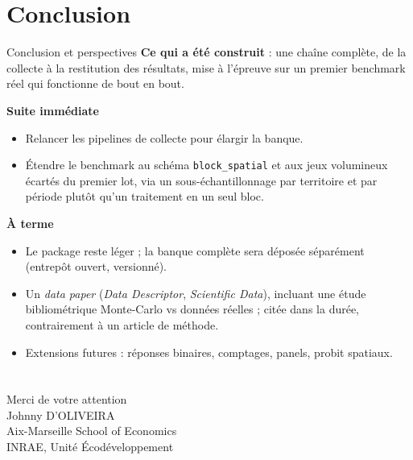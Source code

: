 \documentclass[aspectratio=169,11pt]{beamer}
\begin{document}
\section{Conclusion}
\begin{frame}{Conclusion et perspectives}
\footnotesize
\textbf{Ce qui a été construit} : une chaîne complète, de la collecte à la
restitution des résultats, mise à l'épreuve sur un premier benchmark réel qui
fonctionne de bout en bout.
\vspace{0.06cm}

\textbf{Suite immédiate}
\begin{itemize}
    \item Relancer les pipelines de collecte pour élargir la banque.
    \item Étendre le benchmark au schéma \texttt{block\_spatial} et aux jeux
    volumineux écartés du premier lot, via un sous-échantillonnage par
    territoire et par période plutôt qu'un traitement en un seul bloc.
\end{itemize}
\vspace{0.04cm}
\textbf{À terme}
\begin{itemize}
    \item Le package reste léger ; la banque complète sera déposée séparément (entrepôt ouvert, versionné).
    \item Un \emph{data paper} (\textit{Data Descriptor}, \textit{Scientific Data}), incluant une étude bibliométrique Monte-Carlo vs données réelles ; citée dans la durée, contrairement à un article de méthode.
    \item Extensions futures : réponses binaires, comptages, panels, probit spatiaux.
\end{itemize}
\end{frame}

\section*{}
\begin{frame}[plain]
  \begin{center}
    {\Huge Merci de votre attention}\\[1em]
    {\large Johnny D'OLIVEIRA}\\[0.3em]
    Aix-Marseille School of Economics\\[0.3em]
    INRAE, Unité Écodéveloppement
  \end{center}
\end{frame}
\end{document}
